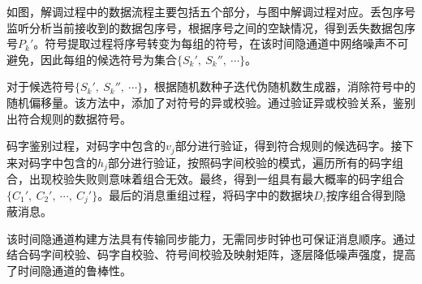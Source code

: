 如图，解调过程中的数据流程主要包括五个部分，与图中解调过程对应。丢包序号监听分析当前接收到的数据包序号，根据序号之间的空缺情况，得到丢失数据包序号$P_{k}'$。符号提取过程将序号转变为每组的符号，在该时间隐通道中网络噪声不可避免，因此每组的候选符号为集合$\{S_{k}',\ S_{k}'',\ \cdots \}$。

对于候选符号$\{S_{k}',\ S_{k}'',\ \cdots \}$，根据随机数种子迭代伪随机数生成器，消除符号中的随机偏移量。该方法中，添加了对符号的异或校验。通过验证异或校验关系，鉴别出符合规则的数据符号。

码字鉴别过程，对码字中包含的$v_{j}$部分进行验证，得到符合规则的候选码字。接下来对码字中包含的$h_{j}$部分进行验证，按照码字间校验的模式，遍历所有的码字组合，出现校验失败则意味着组合无效。最终，得到一组具有最大概率的码字组合$\{C_{1}',\ C_{2}',\ \cdots,\ C_{j}'\}$。最后的消息重组过程，将码字中的数据块$D_{i}$按序组合得到隐蔽消息。

该时间隐通道构建方法具有传输同步能力，无需同步时钟也可保证消息顺序。通过结合码字间校验、码字自校验、符号间校验及映射矩阵，逐层降低噪声强度，提高了时间隐通道的鲁棒性。